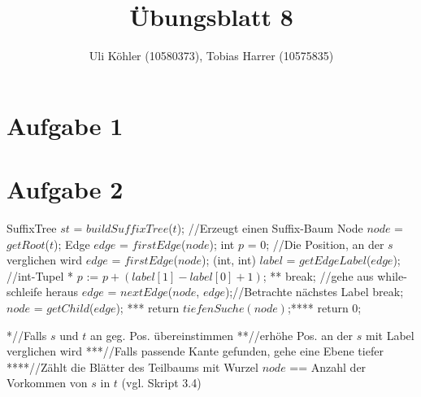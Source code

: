\documentclass[a4paper,10pt,oneside,leqno]{scrartcl}
\title{Übungsblatt 8}
\author{Uli Köhler (10580373), Tobias Harrer (10575835)}
\begin{document}
\maketitle
\section*{Aufgabe 1}
\section*{Aufgabe 2}
\begin{algorithmic}
  \State SuffixTree $st$ = $buildSuffixTree$($t$); //Erzeugt einen Suffix-Baum
  \State Node $node$ = $getRoot$($t$);
  \State Edge $edge$ = $firstEdge$($node$);
  \State int $p$ = 0; //Die Position, an der $s$ verglichen wird
    \State $edge$ = $firstEdge$($node$);
      \State (int, int) $label$ = $getEdgeLabel$($edge$); //int-Tupel
       *
	\State $p$ := $p+(label[1]-label[0]+1)$; **
	\State break; //gehe aus while-schleife heraus
      \EndIf
      \State $edge$ = $nextEdge$($node$, $edge$);//Betrachte nächstes Label
    \EndWhile
    \State break;
    \Else
    \State $node$ = $getChild$($edge$); ***
    \EndIf
  \EndWhile
    \State return $tiefenSuche(node)$;****
  \Else
    \State return 0;
  \EndIf
 \EndFunction
\end{algorithmic}
*//Falls $s$ und $t$ an geg. Pos. übereinstimmen\newline
**//erhöhe Pos. an der $s$ mit Label verglichen wird\newline
***//Falls passende Kante gefunden, gehe eine Ebene tiefer\newline
****//Zählt die Blätter des Teilbaums mit Wurzel $node$ == Anzahl der Vorkommen von $s$ in $t$ (vgl. Skript 3.4)\newline
\end{document}
